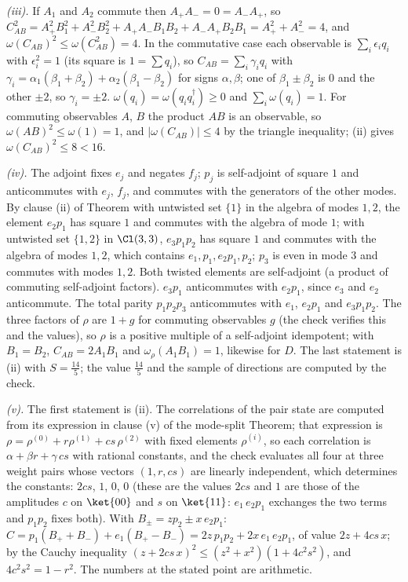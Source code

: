 \emph{(iii).} If $A_{1}$ and $A_{2}$ commute then $A_{+}A_{-} = 0 = A_{-}A_{+}$, so $C_{AB}^{2} = A_{+}^{2}B_{1}^{2} + A_{-}^{2}B_{2}^{2} + A_{+}A_{-}B_{1}B_{2} + A_{-}A_{+}B_{2}B_{1} = A_{+}^{2} + A_{-}^{2} = 4$, and $\omega(C_{AB})^{2} \le \omega(C_{AB}^{2}) = 4$. In the commutative case each observable is $\sum_{i}\epsilon_{i}q_{i}$ with $\epsilon_{i}^{2} = 1$ (its square is $1 = \sum q_{i}$), so $C_{AB} = \sum_{i}\gamma_{i}q_{i}$ with $\gamma_{i} = \alpha_{1}(\beta_{1} + \beta_{2}) + \alpha_{2}(\beta_{1} - \beta_{2})$ for signs $\alpha, \beta$; one of $\beta_{1} \pm \beta_{2}$ is $0$ and the other $\pm 2$, so $\gamma_{i} = \pm 2$. $\omega(q_{i}) = \omega(q_{i}q_{i}^{\dagger}) \ge 0$ and $\sum_{i}\omega(q_{i}) = 1$. For commuting observables $A$, $B$ the product $AB$ is an observable, so $\omega(AB)^{2} \le \omega(1) = 1$, and $|\omega(C_{AB})| \le 4$ by the triangle inequality; (ii) gives $\omega(C_{AB})^{2} \le 8 < 16$.

\emph{(iv).} The adjoint fixes $e_{j}$ and negates $f_{j}$; $p_{j}$ is self-adjoint of square $1$ and anticommutes with $e_{j}$, $f_{j}$, and commutes with the generators of the other modes. By clause (ii) of Theorem  with untwisted set $\{1\}$ in the algebra of modes $1, 2$, the element $e_{2}p_{1}$ has square $1$ and commutes with the algebra of mode $1$; with untwisted set $\{1, 2\}$ in $\Cl(3,3)$, $e_{3}p_{1}p_{2}$ has square $1$ and commutes with the algebra of modes $1, 2$, which contains $e_{1}, p_{1}, e_{2}p_{1}, p_{2}$; $p_{3}$ is even in mode $3$ and commutes with modes $1, 2$. Both twisted elements are self-adjoint (a product of commuting self-adjoint factors). $e_{3}p_{1}$ anticommutes with $e_{2}p_{1}$, since $e_{3}$ and $e_{2}$ anticommute. The total parity $p_{1}p_{2}p_{3}$ anticommutes with $e_{1}$, $e_{2}p_{1}$ and $e_{3}p_{1}p_{2}$. The three factors of $\rho$ are $1 + g$ for commuting observables $g$ (the check verifies this and the values), so $\rho$ is a positive multiple of a self-adjoint idempotent; with $B_{1} = B_{2}$, $C_{AB} = 2A_{1}B_{1}$ and $\omega_{\rho}(A_{1}B_{1}) = 1$, likewise for $D$. The last statement is (ii) with $S = \tfrac{14}{5}$; the value $\tfrac{14}{5}$ and the sample of directions are computed by the check.

\emph{(v).} The first statement is (ii). The correlations of the pair state are computed from its expression in clause (v) of the mode-split Theorem; that expression is $\rho = \rho^{(0)} + r\rho^{(1)} + cs\,\rho^{(2)}$ with fixed elements $\rho^{(i)}$, so each correlation is $\alpha + \beta r + \gamma\,cs$ with rational constants, and the check evaluates all four at three weight pairs whose vectors $(1, r, cs)$ are linearly independent, which determines the constants: $2cs$, $1$, $0$, $0$ (these are the values $2cs$ and $1$ are those of the amplitudes $c$ on $\ket{00}$ and $s$ on $\ket{11}$: $e_{1}\,e_{2}p_{1}$ exchanges the two terms and $p_{1}p_{2}$ fixes both). With $B_{\pm} = zp_{2} \pm x\,e_{2}p_{1}$: $C = p_{1}(B_{+} + B_{-}) + e_{1}(B_{+} - B_{-}) = 2z\,p_{1}p_{2} + 2x\,e_{1}\,e_{2}p_{1}$, of value $2z + 4cs\,x$; by the Cauchy inequality $(z + 2cs\,x)^{2} \le (z^{2} + x^{2})(1 + 4c^{2}s^{2})$, and $4c^{2}s^{2} = 1 - r^{2}$. The numbers at the stated point are arithmetic.
